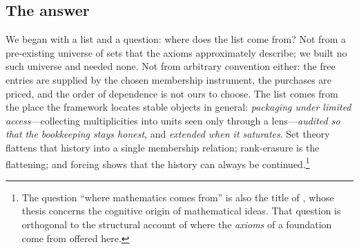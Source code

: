 \subsection{The answer}

We began with a list and a question: where does the list come from? Not from a pre-existing
universe of sets that the axioms approximately describe; we built no such universe and needed
none. Not from arbitrary convention either: the free entries are supplied by the chosen membership
instrument, the purchases are priced, and the order of dependence is not ours to choose. The list
comes from the place the framework locates stable objects in general: \emph{packaging under limited
access}---collecting multiplicities into units seen only through a lens---\emph{audited so that the
bookkeeping stays honest}, and \emph{extended when it saturates}. Set theory flattens that history
into a single membership relation; rank-erasure is the flattening; and forcing shows that the
history can always be continued.\footnote{The question ``where mathematics comes from'' is also
the title of \citet{LakoffNunez2000}, whose thesis concerns the cognitive origin of mathematical
ideas. That question is orthogonal to the structural account of where the \emph{axioms} of a
foundation come from offered here.}
